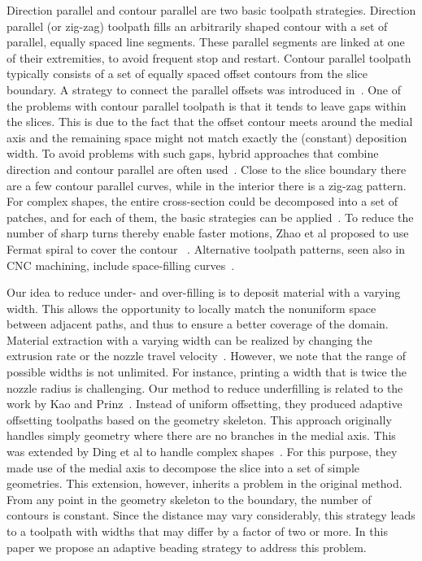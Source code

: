Direction parallel and contour parallel are two basic toolpath strategies. Direction parallel (or zig-zag) toolpath fills an arbitrarily shaped contour with a set of parallel, equally spaced line segments. These parallel segments are linked at one of their extremities, to avoid frequent stop and restart. Contour parallel toolpath typically consists of a set of equally spaced offset contours from the slice boundary. A strategy to connect the parallel offsets was introduced in~\cite{KUIPERS2019CAD}. One of the problems with contour parallel toolpath is that it tends to leave gaps within the slices. This is due to the fact that the offset contour meets around the medial axis and the remaining space might not match exactly the (constant) deposition width. To avoid problems with such gaps, hybrid approaches that combine direction and contour parallel are often used~\cite{Mcmains2000DETC,Jin2013adaptive}. Close to the slice boundary there are a few contour parallel curves, while in the interior there is a zig-zag pattern. For complex shapes, the entire cross-section could be decomposed into a set of patches, and for each of them, the basic strategies can be applied~\cite{Ding2014}. To reduce the number of sharp turns thereby enable faster motions, Zhao et al proposed to use Fermat spiral to cover the contour ~\cite{Zhao2016}. Alternative toolpath patterns, seen also in CNC machining, include space-filling curves~\cite{Cox1994CAD,Griffiths1994,Shaikh2016}.

Our idea to reduce under- and over-filling is to deposit material with a varying width. This allows the opportunity to locally match the nonuniform space between adjacent paths, and thus to ensure a better coverage of the domain. Material extraction with a varying width can be realized by changing the extrusion rate or the nozzle travel velocity~\cite{Ertay2018}. However, we note that the range of possible widths is not unlimited. For instance, printing a width that is twice the nozzle radius is challenging. Our method to reduce underfilling is related to the work by Kao and Prinz~\cite{kao1998optimal}. Instead of uniform offsetting, they produced adaptive offsetting toolpaths based on the geometry skeleton. This approach originally handles simply geometry where there are no branches in the medial axis. This was extended by Ding et al to handle complex shapes~\cite{Ding2016a}. For this purpose, they made use of the medial axis to decompose the slice into a set of simple geometries. This extension, however, inherits a problem in the original method. From any point in the geometry skeleton to the boundary, the number of contours is constant. Since the distance may vary considerably, this strategy leads to a toolpath with widths that may differ by a factor of two or more. In this paper we propose an adaptive beading strategy to address this problem.

